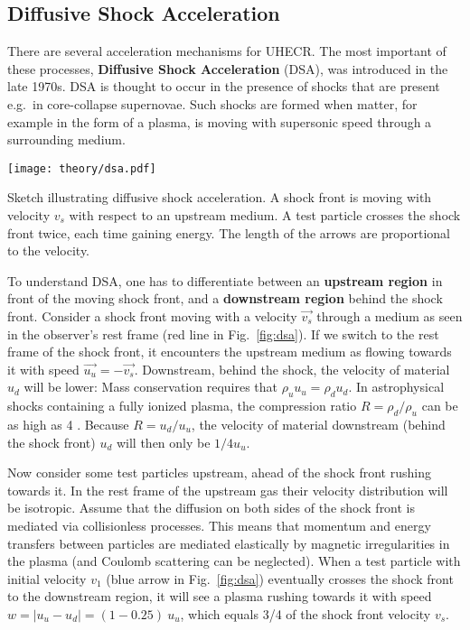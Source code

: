 \subsection{Diffusive Shock Acceleration}\label{dsa}
There are several acceleration mechanisms for UHECR. The most important of these processes, \textbf{Diffusive Shock Acceleration} (DSA), was introduced in the late 1970s. DSA is thought to occur in the presence of shocks that are present e.g.\ in core-collapse supernovae. Such shocks are formed when matter, for example in the form of a plasma, is moving with supersonic speed through a surrounding medium.

\begin{marginfigure}
    \texttt{[image: theory/dsa.pdf]}
    \caption[Diffusive shock acceleration]{Sketch illustrating diffusive shock acceleration. A shock front is moving with velocity $v_s$ with respect to an upstream medium. A test particle crosses the shock front twice, each time gaining energy. The length of the arrows are proportional to the velocity.}
\end{marginfigure}

To understand DSA, one has to differentiate between an \textbf{upstream region} in front of the moving shock front, and a \textbf{downstream region} behind the shock front. Consider a shock front moving with a velocity $\vec{v_s}$ through a medium as seen in the observer's rest frame (red line in Fig.~\ref{fig:dsa}). If we switch to the rest frame of the shock front, it encounters the upstream medium as flowing towards it with speed $\vec{u_u}=-\vec{v_s}$. Downstream, behind the shock, the velocity of material $u_d$ will be lower: Mass conservation requires that $\rho_u u_u = \rho_d u_d$. In astrophysical shocks containing a fully ionized plasma, the compression ratio $R=\rho_d/\rho_u$ can be as high as 4 . Because $R=u_d/u_u$, the velocity of material downstream (behind the shock front) $u_d$ will then only be $1/4 u_u$.

Now consider some test particles upstream, ahead of the shock front rushing towards it. In the rest frame of the upstream gas their velocity distribution will be isotropic. Assume that the diffusion on both sides of the shock front is mediated via collisionless processes. This means that momentum and energy transfers between particles are mediated elastically by magnetic irregularities in the plasma (and Coulomb scattering can be neglected). When a test particle with initial velocity $v_1$ (blue arrow in Fig.~\ref{fig:dsa}) eventually crosses the shock front to the downstream region, it will see a plasma rushing towards it with speed $w=|u_u-u_d| = (1-0.25)~u_u$, which equals 3/4 of the shock front velocity $v_s$.

